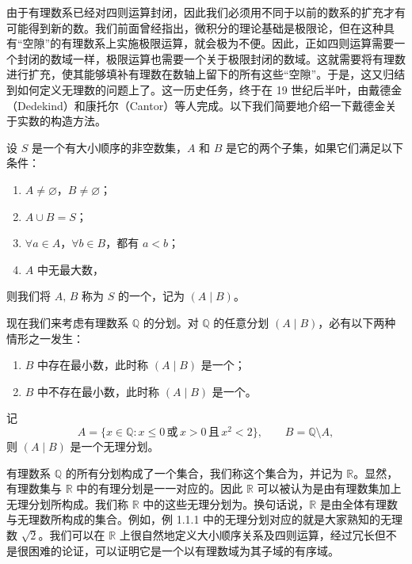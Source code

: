 \documentclass[UTF8,12pt,a4paper,fontset=fandol]{ctexbook}
\begin{document}
由于有理数系已经对四则运算封闭，因此我们必须用不同于以前的数系的扩充才有可能得到新的数。我们前面曾经指出，微积分的理论基础是极限论，但在这种具有“空隙”的有理数系上实施极限运算，就会极为不便。因此，正如四则运算需要一个封闭的数域一样，极限运算也需要一个关于极限封闭的数域。这就需要将有理数进行扩充，使其能够填补有理数在数轴上留下的所有这些“空隙”。于是，这又归结到如何定义无理数的问题上了。这一历史任务，终于在 19 世纪后半叶，由戴德金（Dedekind）和康托尔（Cantor）等人完成。以下我们简要地介绍一下戴德金关于实数的构造方法。


\begin{definition}
设 $S$ 是一个有大小顺序的非空数集，$A$ 和 $B$ 是它的两个子集，如果它们满足以下条件：
\begin{enumerate}[label=(\arabic*)]
  \item $A\ne\varnothing$，$B\ne\varnothing$；
  \item $A\cup B=S$；
  \item $\forall a\in A$，$\forall b\in B$，都有 $a<b$；
  \item $A$ 中无最大数，
\end{enumerate}
则我们将 $A,\,B$ 称为 $S$ 的一个，记为 $(A\mid B)$。
\end{definition}


现在我们来考虑有理数系 $\mathbb{Q}$ 的分划。对 $\mathbb{Q}$ 的任意分划 $(A\mid B)$，必有以下两种情形之一发生：
\begin{enumerate}[label=(\arabic*)]
  \item $B$ 中存在最小数，此时称 $(A\mid B)$ 是一个；
  \item $B$ 中不存在最小数，此时称 $(A\mid B)$ 是一个。
\end{enumerate}


\begin{example}
记
\[
  A=\{x\in\mathbb{Q}:x\leqslant 0\,\text{或}\, x>0\,\text{且}\,x^2<2\},\qquad B=\mathbb{Q}\setminus A,
\]
则 $(A\mid B)$ 是一个无理分划。
\end{example}


有理数系 $\mathbb{Q}$ 的所有分划构成了一个集合，我们称这个集合为，并记为 $\mathbb{R}$。显然，有理数集与 $\mathbb{R}$ 中的有理分划是一一对应的。因此 $\mathbb{R}$ 可以被认为是由有理数集加上无理分划所构成。我们称 $\mathbb{R}$ 中的这些无理分划为。换句话说，$\mathbb{R}$ 是由全体有理数与无理数所构成的集合。例如，例 1.1.1 中的无理分划对应的就是大家熟知的无理数 $\sqrt{2}$。我们可以在 $\mathbb{R}$ 上很自然地定义大小顺序关系及四则运算，经过冗长但不是很困难的论证，可以证明它是一个以有理数域为其子域的有序域。
\end{document}
